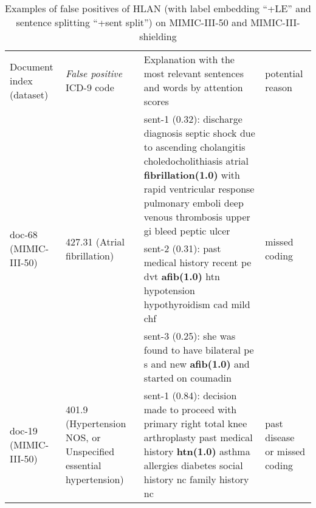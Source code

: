 \documentclass[final,5p,times,twocolumn]{elsarticle}
\begin{document}
\begin{table*}[th]
\caption{Examples of false positives of HLAN (with label embedding ``+LE'' and sentence splitting ``+sent split'') on MIMIC-III-50 and MIMIC-III-shielding}\label{fp-interpretability-results}
\footnotesize
\begin{tabular}{lp{2.7cm}p{7cm}p{2.7cm}}
\cline{1-4}
Document index (dataset)                          & \textit{False positive} ICD-9 code    & Explanation with the most relevant sentences and words by attention scores                                                                                                                                                                                                                      & potential reason                                                     \\
\cline{1-4}
\multirow{3}{*}{doc-68   (MIMIC-III-50)}     & \multirow{3}{3cm}{427.31 (Atrial fibrillation)} & sent-1 (0.32): discharge diagnosis septic shock due to ascending   cholangitis choledocholithiasis atrial \textbf{fibrillation(1.0)} with rapid   ventricular response pulmonary emboli deep venous thrombosis upper gi bleed   peptic ulcer & \multirow{3}{3cm}{missed coding}                       \\
\cline{3-3}
                                             &                         & sent-2 (0.31): past medical history   recent pe dvt \textbf{afib(1.0)} htn hypotension hypothyroidism cad mild chf                                                                                                                           &                                                                      \\
\cline{3-3}
                                             &                         & sent-3 (0.25): she was found to have   bilateral pe s and new \textbf{afib(1.0)} and started on coumadin                                                                                                                                     &                                                                      \\
\cline{1-4}
doc-19 (MIMIC-III-50)                        & 401.9 (Hypertension NOS, or Unspecified essential hypertension)                   & sent-1 (0.84): decision made to proceed with primary right total knee   arthroplasty past medical history \textbf{htn(1.0)} asthma allergies diabetes social   history nc family history nc                                                  & \multirow{3}{3cm}{past disease or missed coding}      \\

\end{tabular}
\end{table*}
\end{document}
